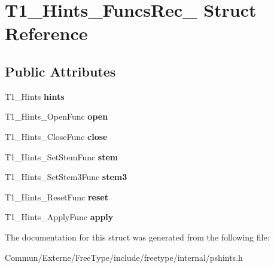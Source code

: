 \hypertarget{struct_t1___hints___funcs_rec__}{}\section{T1\+\_\+\+Hints\+\_\+\+Funcs\+Rec\+\_\+ Struct Reference}
\label{struct_t1___hints___funcs_rec__}
\subsection*{Public Attributes}
\begin{DoxyCompactItemize}
\item 
T1\+\_\+\+Hints {\bfseries hints}\hypertarget{struct_t1___hints___funcs_rec___a6a58f489e362b746703b4caae91349ef}{}\label{struct_t1___hints___funcs_rec___a6a58f489e362b746703b4caae91349ef}

\item 
T1\+\_\+\+Hints\+\_\+\+Open\+Func {\bfseries open}\hypertarget{struct_t1___hints___funcs_rec___a41ca09a042c8e92f64822f19486a622a}{}\label{struct_t1___hints___funcs_rec___a41ca09a042c8e92f64822f19486a622a}

\item 
T1\+\_\+\+Hints\+\_\+\+Close\+Func {\bfseries close}\hypertarget{struct_t1___hints___funcs_rec___aa6d879215bff42f4b3851a9151c78505}{}\label{struct_t1___hints___funcs_rec___aa6d879215bff42f4b3851a9151c78505}

\item 
T1\+\_\+\+Hints\+\_\+\+Set\+Stem\+Func {\bfseries stem}\hypertarget{struct_t1___hints___funcs_rec___abdbf955a1fc9b19799ed8ea8137c9381}{}\label{struct_t1___hints___funcs_rec___abdbf955a1fc9b19799ed8ea8137c9381}

\item 
T1\+\_\+\+Hints\+\_\+\+Set\+Stem3\+Func {\bfseries stem3}\hypertarget{struct_t1___hints___funcs_rec___acc1edae831d279929f93c8eb1872daa3}{}\label{struct_t1___hints___funcs_rec___acc1edae831d279929f93c8eb1872daa3}

\item 
T1\+\_\+\+Hints\+\_\+\+Reset\+Func {\bfseries reset}\hypertarget{struct_t1___hints___funcs_rec___a5646878cdabd593389e28cffd8b077cb}{}\label{struct_t1___hints___funcs_rec___a5646878cdabd593389e28cffd8b077cb}

\item 
T1\+\_\+\+Hints\+\_\+\+Apply\+Func {\bfseries apply}\hypertarget{struct_t1___hints___funcs_rec___a3fb5f01de31da9efb2ae8f5251b4d506}{}\label{struct_t1___hints___funcs_rec___a3fb5f01de31da9efb2ae8f5251b4d506}

\end{DoxyCompactItemize}


The documentation for this struct was generated from the following file\+:\begin{DoxyCompactItemize}
\item 
Commun/\+Externe/\+Free\+Type/include/freetype/internal/pshints.\+h\end{DoxyCompactItemize}
